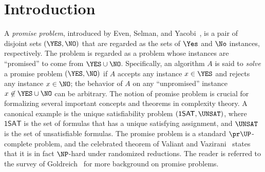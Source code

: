 \documentclass{toc}
\begin{document}
\begin{frontmatter}
\begin{abstract}

    Applying the principle to complexity-theoretic pseudorandom generators,
    we introduce a family of Meta-computational Circuit Lower-bound Problems (MCLPs),
    which are problems of distinguishing the truth tables of
    explicit functions from hard functions.
    Our results generalize the hardness versus randomness framework
    and identify problems whose circuit lower bounds characterize the existence of hitting set generators.

    We also establish the equivalence between
the existence of a non-trivial derandomization algorithm for uniform algorithms
    and
a uniform lower bound for a problem of approximating Levin's $\Kt$-complexity.
  \end{abstract}

  %

\end{frontmatter}

%
%
%

\section{Introduction}
\label{section_introduction}


A \emph{promise problem}, introduced by Even, Selman, and Yacobi~\cite{EvenSY84_iandc_journals},
is a pair of disjoint sets $(\YES, \NO)$ that are regarded as the sets of $\Yes$ and $\No$ instances, respectively.
The problem is regarded as a problem whose instances are ``promised'' to come from $\YES \cup \NO$.
Specifically,
an algorithm $A$ is said to \emph{solve} a promise problem $(\YES, \NO)$
if
$A$ accepts any instance $x \in \YES$ and rejects any instance $x \in \NO$;
the behavior of $A$ on any ``unpromised'' instance $x \not\in \YES \cup \NO$ can be arbitrary.
The notion of promise problem is crucial for formalizing several important concepts and theorems in complexity theory.
A canonical example is the unique satisfiability problem $(\mathsf{1SAT}, \UNSAT)$, where $\mathsf{1SAT}$ is the set of formulas that has a unique satisfying assignment, and $\UNSAT$ is the set of unsatisfiable formulas.
%
%
The promise problem is a standard $\pr\UP$-complete problem, and
the celebrated theorem of Valiant and Vazirani~\cite{ValiantV86_tcs_journals}
states that it is in fact $\NP$-hard under randomized reductions.
The reader is referred to the survey of Goldreich~\cite{Goldreich06a_birthday_conf} for more background on promise problems.
\end{document}
